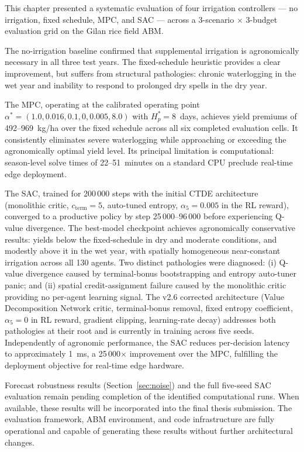 This chapter presented a systematic evaluation of four irrigation controllers — no
irrigation, fixed schedule, MPC, and SAC — across a 3-scenario $\times$ 3-budget
evaluation grid on the Gilan rice field ABM.

The no-irrigation baseline confirmed that supplemental irrigation is agronomically
necessary in all three test years.  The fixed-schedule heuristic provides a clear
improvement, but suffers from structural pathologies: chronic waterlogging in the wet
year and inability to respond to prolonged dry spells in the dry year.

The MPC, operating at the calibrated operating point $\alpha^* = (1.0, 0.016, 0.1,
0, 0.005, 8.0)$ with $H_p^* = 8$~days, achieves yield premiums of 492--969~kg/ha
over the fixed schedule across all six completed evaluation cells.  It consistently
eliminates severe waterlogging while approaching or exceeding the agronomically optimal
yield level.  Its principal limitation is computational: season-level solve times of
22--51~minutes on a standard CPU preclude real-time edge deployment.

The SAC, trained for 200\,000 steps with the initial CTDE architecture (monolithic
critic, $c_{\mathrm{term}} = 5$, auto-tuned entropy, $\alpha_5 = 0.005$ in the RL
reward), converged to a productive policy by step 25\,000--96\,000 before experiencing
Q-value divergence. The best-model checkpoint achieves agronomically conservative
results: yields below the fixed-schedule in dry and moderate conditions, and modestly
above it in the wet year, with spatially homogeneous near-constant irrigation across
all 130 agents. Two distinct pathologies were diagnosed: (i) Q-value divergence
caused by terminal-bonus bootstrapping and entropy auto-tuner panic; and (ii)
spatial credit-assignment failure caused by the monolithic critic providing no
per-agent learning signal. The v2.6 corrected architecture (Value Decomposition
Network critic, terminal-bonus removal, fixed entropy coefficient, $\alpha_5 = 0$
in RL reward, gradient clipping, learning-rate decay) addresses both pathologies
at their root and is currently in training across five seeds.  Independently of
agronomic performance, the SAC reduces per-decision latency to approximately 1~ms,
a 25\,000$\times$ improvement over the MPC, fulfilling the deployment objective for
real-time edge hardware.

Forecast robustness results (Section~\ref{sec:noise}) and the full five-seed SAC
evaluation remain pending completion of the identified computational runs.  When
available, these results will be incorporated into the final thesis submission.
The evaluation framework, ABM environment, and code infrastructure are fully operational
and capable of generating these results without further architectural changes.
